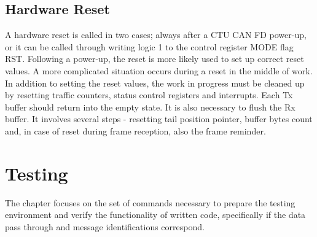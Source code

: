 \documentclass{ctuthesis}
\begin{document}
 \section{Hardware Reset}
  A hardware reset is called in two cases; always after a CTU CAN FD power-up, or it can be called through writing logic 1 to the control register MODE flag RST. Following a power-up, the reset is more likely used to set up correct reset values. A more complicated situation occurs during a reset in the middle of work. In addition to setting the reset values, the work in progress must be cleaned up by resetting traffic counters, status control registers and interrupts. Each Tx buffer should return into the empty state. It is also necessary to flush the Rx buffer. It involves several steps - resetting tail position pointer, buffer bytes count and, in case of reset during frame reception, also the frame reminder.
 
\chapter{Testing}
 The chapter focuses on the set of commands necessary to prepare the testing environment and verify the functionality of written code, specifically if the data pass through and message identifications correspond.
\end{document}
